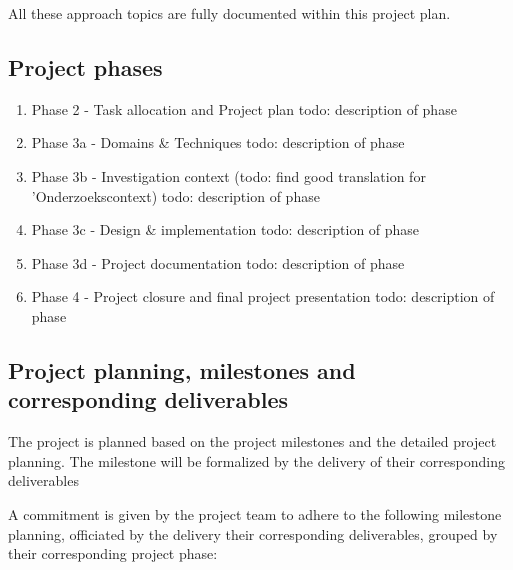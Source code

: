 All these approach topics are fully documented within this project plan.


\subsection{Project phases}
 \begin{enumerate}
	\item Phase 2 - Task allocation and Project plan
	todo: description of phase
	\item Phase 3a - Domains \& Techniques
	todo: description of phase
 	\item Phase 3b - Investigation context (todo: find good translation for 'Onderzoekscontext)
	todo: description of phase
 	\item Phase 3c - Design \& implementation
	todo: description of phase
 	\item Phase 3d - Project documentation
	todo: description of phase
	\item Phase 4 - Project closure and final project presentation	todo: description of phase
\end {enumerate}

\subsection{Project planning, milestones and corresponding deliverables }
The project is planned based on the project milestones and the detailed project planning. The milestone will be formalized by the delivery of their corresponding deliverables

A commitment is given by the project team to adhere to the following milestone planning, officiated by the delivery their corresponding deliverables, grouped by their corresponding project phase:

